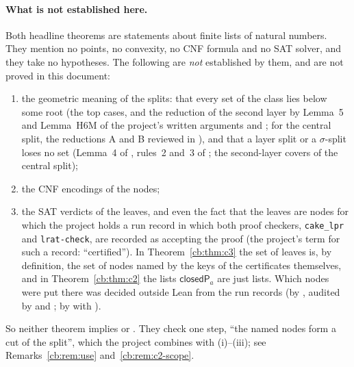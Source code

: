 \paragraph{What is not established here.} Both headline theorems are statements about finite lists of natural numbers.
They mention no points, no convexity, no CNF formula and no SAT solver, and they take no hypotheses. The following are
\emph{not} established by them, and are not proved in this document:
\begin{enumerate}[label=(\roman*)]
\item the geometric meaning of the splits: that every set of the class lies below some root (the top cases, and the
  reduction of the second layer by Lemma~5 and Lemma~H6M of the project's written arguments 
  and ; for the central split, the reductions A and B reviewed in ),
  and that a layer split or a $\sigma$-split loses no set (Lemma~4 of , rules~2 and~3 of
  ; the second-layer covers of the central split);
\item the CNF encodings of the nodes;
\item the SAT verdicts of the leaves, and even the fact that the leaves are nodes for which the project holds a run
  record in which both proof checkers, \texttt{cake\_lpr} and \texttt{lrat-check}, are recorded as accepting the proof
  (the project's term for such a record: ``certified''). In Theorem~\ref{cb:thm:c3} the set of leaves is, by
  definition, the set of nodes named by the keys of the certificates themselves, and in Theorem~\ref{cb:thm:c2} the
  lists $\mathsf{closedP}_a$ are just
  lists. Which nodes were put there was decided outside Lean from the run records (by
  , audited by  and
  ; by  with ).
\end{enumerate}
So neither theorem implies  or . They check one step, ``the named nodes form a cut
of the split'', which the project combines with (i)--(iii); see Remarks~\ref{cb:rem:use} and~\ref{cb:rem:c2-scope}.

